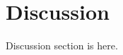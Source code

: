 \FloatBarrier
\section{Discussion} \label{sec:Discussion}
\FloatBarrier

Discussion section is here.